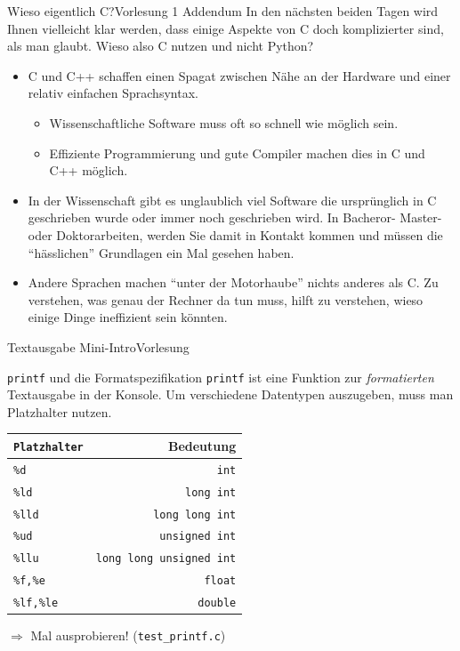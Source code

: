 \documentclass[xcolor=dvipsnames]{beamer}
\newcounter{lecturecounter}
\begin{document}
\begin{frame}{Wieso eigentlich C?}{Vorlesung 1 Addendum}
  In den nächsten beiden Tagen wird Ihnen vielleicht klar werden, dass einige Aspekte von C doch komplizierter sind, als man glaubt. Wieso also C nutzen und nicht Python?
  \vspace{0.3cm}
  \begin{itemize}
    \item{C und C++ schaffen einen Spagat zwischen Nähe an der Hardware und einer relativ einfachen Sprachsyntax.}
    \begin{itemize}
      \item{Wissenschaftliche Software muss oft so schnell wie möglich sein.}
      \item{Effiziente Programmierung und gute Compiler machen dies in C und C++ möglich.}
    \end{itemize}
    \vspace{0.4cm}
    \item{In der Wissenschaft gibt es unglaublich viel Software die ursprünglich in C geschrieben wurde oder immer noch geschrieben wird. In Bacheror- Master- oder Doktorarbeiten, werden Sie damit in Kontakt kommen und müssen die ``hässlichen'' Grundlagen ein Mal gesehen haben.}
    \vspace{0.4cm}
    \item{Andere Sprachen machen ``unter der Motorhaube'' nichts anderes als C. Zu verstehen, was genau der Rechner da tun muss, hilft zu verstehen, wieso einige Dinge ineffizient sein könnten.}
  \end{itemize}
\end{frame}

\begin{frame}[fragile]{Textausgabe Mini-Intro}{Vorlesung }
  \begin{block}{\texttt{printf} und die Formatspezifikation}
    \texttt{printf} ist eine Funktion zur \emph{formatierten} Textausgabe in der Konsole.
    Um verschiedene Datentypen auszugeben, muss man Platzhalter nutzen.
  \end{block}
  \begin{center}
  \begin{tabular}{lr}
    \hline
    \texttt{Platzhalter} & Bedeutung \\\hline
    \texttt{\%d}        &  \texttt{int} \\
    \texttt{\%ld}  &  \texttt{long int} \\
    \texttt{\%lld} &  \texttt{long long int} \\
    \texttt{\%ud}  &  \texttt{unsigned int} \\
    \texttt{\%llu} &  \texttt{long long unsigned int} \\
    \texttt{\%f,\%e}   & \texttt{float} \\
    \texttt{\%lf,\%le}  & \texttt{double} \\
    \hline
  \end{tabular}
  \end{center}  
  \begin{block}{}
    $\Rightarrow$ Mal ausprobieren! (\verb|test_printf.c|)
  \end{block}
\end{frame}
\end{document}
